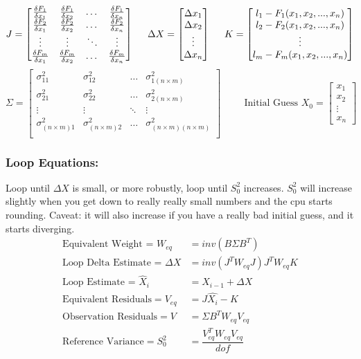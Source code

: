 \[
J = \begin{bmatrix}
\frac{\delta F_1}{\delta x_1} & \frac{\delta F_1}{\delta x_2} & \dots & \frac{\delta F_1}{\delta x_n} \\
\frac{\delta F_2}{\delta x_1} & \frac{\delta F_2}{\delta x_2} & \dots & \frac{\delta F_2}{\delta x_n} \\
\vdots & \vdots & \ddots& \vdots \\
\frac{\delta F_m}{\delta x_1} & \frac{\delta F_m}{\delta x_2} & \dots & \frac{\delta F_m}{\delta x_n} \\
\end{bmatrix}
\hspace{0.5cm}
\Delta X = 
\begin{bmatrix}
\Delta x_1 \\ \Delta x_2 \\ \vdots \\ \Delta x_n
\end{bmatrix}
\hspace{0.5cm}
K = 
\begin{bmatrix}
l_1 - F_1(x_1,x_2,...,x_n) \\ l_2 - F_2(x_1,x_2,...,x_n)\\ \vdots \\ l_m - F_m(x_1,x_2,...,x_n)
\end{bmatrix}
\]
\[
\Sigma = 
\begin{bmatrix}
\sigma_{11}^2 & \sigma_{12}^2 & \dots & \sigma_{1(n\times m)}^2 \\ 
\sigma_{21}^2 & \sigma_{22}^2 & \dots & \sigma_{2(n\times m)}^2 \\ 
\vdots & \vdots & \ddots& \vdots \\
\sigma_{(n\times m)1}^2 & \sigma_{(n\times m)2}^2 & \dots & \sigma_{(n\times m)(n\times m)}^2 \\ 
\end{bmatrix}
\hspace{1cm}
\text{Initial Guess } X_0 = 
\begin{bmatrix}
x_1 \\ x_2 \\ \vdots \\ x_n
\end{bmatrix}
\]
\subsubsection{Loop Equations:}
Loop until $\Delta X $ is small, or more robustly, loop until $S_0^2$ increases.  $S_0^2$ will increase slightly when you get down to really really small numbers and the cpu starts rounding.  Caveat: it will also increase if you have a really bad initial guess, and it starts diverging.
\vspace{0.15cm}
\begin{align*}
	\text{Equivalent Weight = } W_{eq} &= inv(B\Sigma B^T) \\
	\text{Loop Delta Estimate = }\Delta X &= inv(J^TW_{eq}J)J^TW_{eq}K \\
	\text{Loop Estimate = } \hat{X}_i &= X_{i-1}+\Delta X \\
	\text{Equivalent Residuals} = V_{eq} &= J\hat{X_i} - K \\
	\text{Observation Residuals} = V &= \Sigma B^T W_{eq} V_{eq} \\
	\text{Reference Variance} = S_0^2 &= \dfrac{V_{eq}^TW_{eq}V_{eq}}{dof}
\end{align*}

